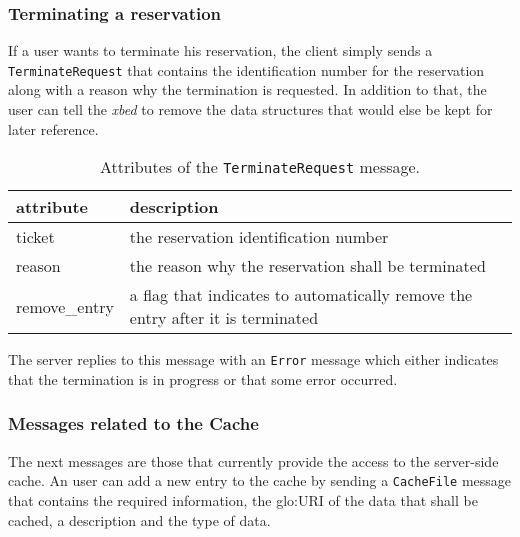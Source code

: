 \subsubsection{Terminating a reservation}

If a  user wants to terminate  his reservation, the client  simply sends a
\texttt{TerminateRequest} that contains  the identification number for the
reservation  along with  a reason  why the  termination is  requested.  In
addition to  that, the user  can tell the  \emph{xbed} to remove  the data
structures that would else be kept for later reference.


\begin{table}[ht]
  \centering
  \begin{tabular}{@{}lp{}@{}}\toprule
    attribute        & \multicolumn{1}{l}{description} \\ \midrule %
    ticket           & the reservation identification number \\
    reason           & the reason why the reservation shall be terminated \\
    remove\_entry    & a flag that indicates to automatically remove the entry after it is terminated \\
    \bottomrule
  \end{tabular}
  \caption{Attributes of the \texttt{TerminateRequest} message.}
  \label{tab:msg:terminate-request}
\end{table}

The server  replies to this  message with an \texttt{Error}  message which
either indicates  that the termination is  in progress or  that some error
occurred.

\subsubsection{Messages related to the Cache}

The  next messages  are those  that currently  provide the  access  to the
server-side cache. An user  can add a new entry to the  cache by sending a
\texttt{CacheFile} message that contains the required information, \ie the
\gls{glo:URI} of the data that shall be cached, a description and the type
of data.

